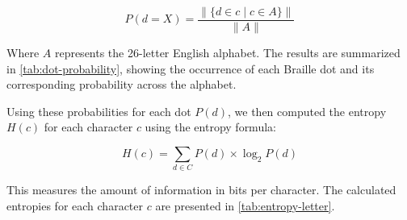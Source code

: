 \[
P(d = X) = \frac{\|\{d \in c \mid c \in A\}\|}{\|A\|}
\]

Where \( A \) represents the 26-letter English alphabet.
The results are summarized in \autoref{tab:dot-probability}, showing the occurrence of each Braille dot and its corresponding probability across the alphabet.


\begin{table}[!ht]
\centering
{}
    \caption{Probability for each dot occurring.}
    \label{tab:dot-probability}
\end{table}

Using these probabilities for each dot \( P(d) \), we then computed the entropy \( H(c) \) for each character \( c \) using the entropy formula:

\[
H(c) = \sum_{d \in C} P(d) \times \log_2 P(d)
\]

This measures the amount of information in bits per character. The calculated entropies for each character \( c \) are presented in \autoref{tab:entropy-letter}.

\begin{table}
    \centering
    \caption{Entropy for each Braille letter rounded to $4$ decimal places.}
    \label{tab:entropy-letter}
\end{table}

